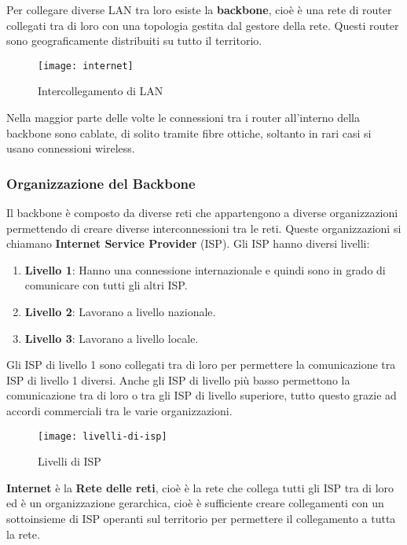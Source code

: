 \documentclass[a4paper]{article}
\begin{document}
\vspace{1em}
\noindent
Per collegare diverse LAN tra loro esiste la \textbf{backbone}, cioè è una rete
di router collegati tra di loro con una topologia
gestita dal gestore della rete. Questi router sono geograficamente distribuiti
su tutto il territorio.
\begin{figure}[H]
  \centering
  \texttt{[image: internet]}
  \caption{Intercollegamento di LAN}
\end{figure}

\noindent
Nella maggior parte delle volte le connessioni tra i router all'interno della
backbone sono cablate, di solito tramite fibre ottiche, soltanto in rari casi
si usano connessioni wireless.

\subsubsection{Organizzazione del Backbone}
Il backbone è composto da diverse reti che appartengono a diverse organizzazioni
permettendo di creare diverse interconnessioni tra le reti. Queste organizzazioni
si chiamano \textbf{Internet Service Provider} (ISP). Gli ISP hanno diversi livelli:
\begin{enumerate}
  \item \textbf{Livello 1}: Hanno una connessione internazionale
    e quindi sono in grado di comunicare con tutti gli altri ISP.
  \item \textbf{Livello 2}: Lavorano a livello nazionale.
  \item \textbf{Livello 3}: Lavorano a livello locale.
\end{enumerate}

\noindent
Gli ISP di livello 1 sono collegati tra di loro per permettere la comunicazione
tra ISP di livello 1 diversi. Anche gli ISP di livello più basso permettono
la comunicazione tra di loro o tra gli ISP di livello superiore, tutto questo
grazie ad accordi commerciali tra le varie organizzazioni.
\begin{figure}[H]
  \centering
  \texttt{[image: livelli-di-isp]}
  \caption{Livelli di ISP}
\end{figure}

\noindent
\textbf{Internet} è la \textbf{Rete delle reti}, cioè è la rete che collega
tutti gli ISP tra di loro ed è un organizzazione gerarchica, cioè è sufficiente
creare collegamenti con un sottoinsieme di ISP operanti sul territorio per permettere
il collegamento a tutta la rete.
\end{document}
